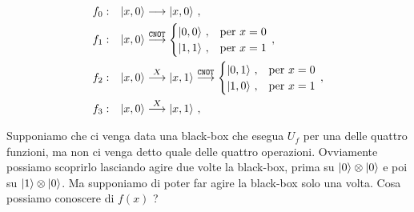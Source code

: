 \begin{align*}
    &f_0: &\ket{x,0} &\longrightarrow \ket{x,0} \, , \\
    &f_1: &\ket{x,0} &\overset{\texttt{CNOT}}{\longrightarrow} 
    \begin{cases}
        \ket{0,0} \, , &\text{per } x = 0 \\
        \ket{1,1} \, , &\text{per } x = 1
    \end{cases} \, , \\
    &f_2: &\ket{x,0} &\overset{X}{\longrightarrow} \ket{x,1} \overset{\texttt{CNOT}}{\longrightarrow}
    \begin{cases}
        \ket{0,1} \, , &\text{per } x = 0 \\
        \ket{1,0} \, , &\text{per } x = 1
    \end{cases} \, , \\
    &f_3: &\ket{x,0} &\overset{X}{\longrightarrow} \ket{x,1} \, , 
\end{align*}

\noindent Supponiamo che ci venga data una black-box che esegua $U_f$ per una delle quattro funzioni, ma non ci venga detto quale delle quattro operazioni. Ovviamente possiamo scoprirlo lasciando agire due volte la black-box, prima su $\ket0 \otimes \ket0$ e poi su $\ket 1 \otimes \ket 0$. Ma supponiamo di poter far agire la black-box solo una volta. Cosa possiamo conoscere di $f(x)$ ?

